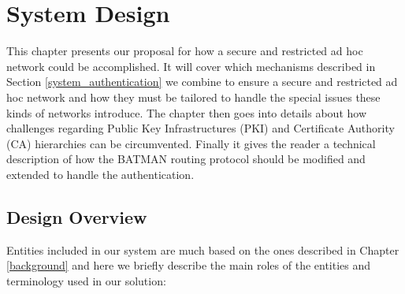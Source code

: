 \chapter{System Design}
\label{system_design}
This chapter presents our proposal for how a secure and restricted ad hoc network could be accomplished. It will cover which mechanisms described in Section \ref{system_authentication} we combine to ensure a secure and restricted ad hoc network and how they must be tailored to handle the special issues these kinds of networks introduce. The chapter then goes into details about how challenges regarding Public Key Infrastructures (PKI) and Certificate Authority (CA) hierarchies can be circumvented. Finally it gives the reader a technical description of how the BATMAN routing protocol should be modified and extended to handle the authentication.

\section{Design Overview} \label{design_overview}
Entities included in our system are much based on the ones described in Chapter \ref{background} and here we briefly describe the main roles of the entities and terminology used in our solution:

